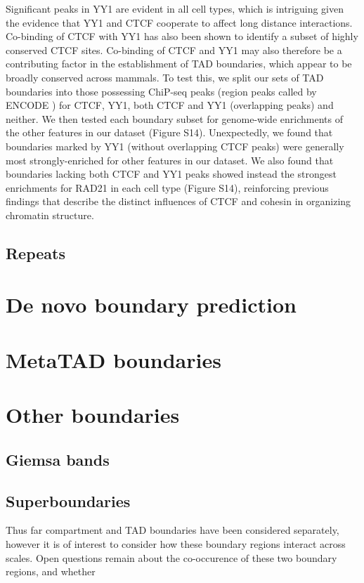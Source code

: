 \documentclass[a4paper,10pt,oneside]{book}
\begin{document}
Significant peaks in YY1 are evident in all cell
types, which is intriguing given the evidence that YY1 and CTCF
cooperate to affect long distance interactions.\cite{Atchison2014} Co-binding of CTCF with YY1 has also been shown
to identify a subset of highly conserved CTCF sites.\cite{Schwalie2013} Co-binding of CTCF and YY1 may also therefore be
a contributing factor in the establishment of TAD boundaries, which
appear to be broadly conserved across mammals.\cite{Dixon2012} To
test this, we split our sets of TAD boundaries into those possessing
ChiP-seq peaks (region peaks called by ENCODE \cite{Dunham2012}) for
CTCF, YY1, both CTCF and YY1 (overlapping peaks) and neither. We then
tested each boundary subset for genome-wide enrichments of the other
features in our dataset (Figure S14). Unexpectedly, we found that
boundaries marked by YY1 (without overlapping CTCF peaks) were
generally most strongly-enriched for other features in our dataset. We
also found that boundaries lacking both CTCF and YY1 peaks showed
instead the strongest enrichments for RAD21 in each cell type (Figure
S14), reinforcing previous findings that describe the distinct
influences of CTCF and cohesin in organizing chromatin structure.\cite{Zuin2013, Seitan2013, Phillips-Cremins2013}

\subsection{Repeats}


\section{De novo boundary prediction}

\section{MetaTAD boundaries}

\section{Other boundaries}

\subsection{Giemsa bands}

\subsection{Superboundaries}

Thus far compartment and TAD boundaries have been considered separately, however it is of interest to consider how these boundary regions interact across scales. Open questions remain about the co-occurence of these two boundary regions, and whether 


\ifstandalone
\begin{small}

\end{small}
\fi
\end{document}
